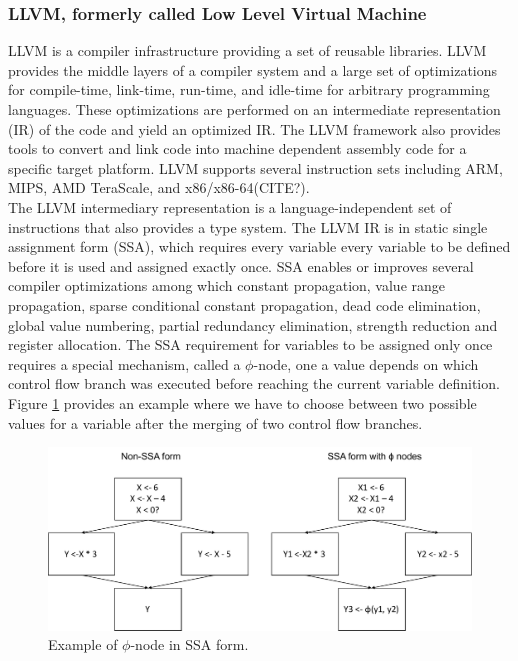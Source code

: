 \subsubsection{LLVM, formerly called Low Level Virtual Machine}
LLVM is a compiler infrastructure providing a set of reusable libraries.
LLVM provides the middle layers of a compiler system and a large set of optimizations for compile-time, link-time, run-time, and idle-time for arbitrary programming languages.
These optimizations are performed on an intermediate representation (IR) of the code and yield an optimized IR.
The LLVM framework also provides tools to convert and link code into machine dependent assembly code for a specific target platform.
LLVM supports several instruction sets including ARM, MIPS, AMD TeraScale, and x86/x86-64(CITE?).\\

The LLVM intermediary representation is a language-independent set of instructions that also provides a type system.
The LLVM IR is in static single assignment form (SSA), which requires every variable every variable to be defined before it is used and assigned exactly once. 
SSA enables or improves several compiler optimizations among which constant propagation, value range propagation, sparse conditional constant propagation, dead code elimination, global value numbering, partial redundancy elimination, strength reduction and register allocation.
The SSA requirement for variables to be assigned only once requires a special mechanism, called a $\phi$-node, one a value depends on which control flow branch was executed before reaching the current variable definition.
Figure \ref{SSA example} provides an example where we have to choose between two possible values for a variable after the merging of two control flow branches.

\begin{figure}[h]
\centering
\includegraphics[scale=0.5]{Figures/SSAForm}
\decoRule
\caption[SSA example]{Example of $\phi$-node in SSA form.}
\label{SSA example}
\end{figure}


